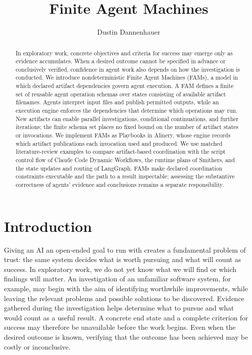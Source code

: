 \documentclass[letterpaper]{article}
\title{Finite Agent Machines}
\author{Dustin Dannenhauer}
\theoremstyle{definition}
\begin{document}
\maketitle

\begin{abstract}
In exploratory work, concrete objectives and criteria for success may emerge
only as evidence accumulates. When a desired outcome cannot be specified in
advance or conclusively verified, confidence in agent work also depends on
how the investigation is conducted. We introduce nondeterministic Finite
Agent Machines (FAMs), a model in which declared artifact dependencies govern
agent execution. A FAM defines a finite set of reusable agent operation
schemas over states consisting of available artifact filenames. Agents
interpret input files and publish permitted outputs, while an execution
engine enforces the dependencies that determine which operations may run.
New artifacts can enable parallel investigations, conditional continuations,
and further iterations; the finite schema set places no fixed bound on the
number of artifact states or invocations. We implement FAMs as Playbooks in
Alinery, whose engine records which artifact publications each invocation
used and produced. We use matched literature-review examples to compare
artifact-based coordination with the script control flow of Claude Code
Dynamic Workflows, the runtime plans of Smithers, and the state updates and
routing of LangGraph. FAMs make declared coordination constraints executable and the
path to a result inspectable; assessing the substantive correctness of
agents' evidence and conclusions remains a separate responsibility.
\end{abstract}

\section{Introduction}

Giving an AI an open-ended goal to run with creates a fundamental problem of trust: the same system decides what is worth pursuing and what will count as success. In exploratory work, we do not yet know what we will find or which findings will matter. An investigation of an unfamiliar software system, for example, may begin with the aim of identifying worthwhile improvements, while leaving the relevant problems and possible solutions to be discovered. Evidence gathered during the investigation helps determine what to pursue and what would count as a useful result. A concrete end state and a complete criterion for success may therefore be unavailable before the work begins. Even when the desired outcome is known, verifying that the outcome has been achieved may be costly or inconclusive.
\end{document}
